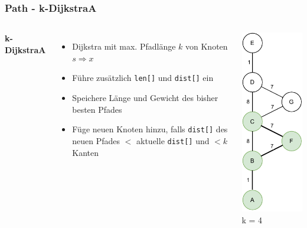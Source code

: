 \documentclass[aspectratio=169]{beamer}
\begin{document}
\begin{frame}
	\frametitle{Path - k-DijkstraA}
	\begin{columns}[c] %
		
		\textbf{k-DijkstraA}
		\begin{itemize}
			\item Dijkstra mit max. Pfadlänge $k$ von Knoten $s \Rightarrow x$
			\item Führe zusätzlich \texttt{len[]} und \texttt{dist[]} ein
			\item Speichere Länge und Gewicht des bisher besten Pfades
			\item Füge neuen Knoten hinzu, falls \texttt{dist[]} des neuen Pfades $<$ aktuelle \texttt{dist[]} und $<k$ Kanten
		\end{itemize}
		\includegraphics[scale=.6]{path_dijkstraAB.pdf}
		k = 4\\
		
		
	\end{columns}
	\end{frame}
	
\end{document}
